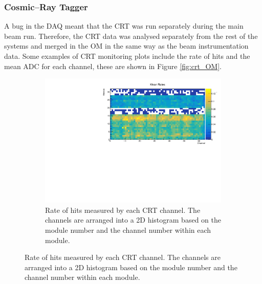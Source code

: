 \subsubsection*{Cosmic--Ray Tagger}
A bug in the DAQ meant that the CRT was run separately during the main beam 
run. Therefore, the CRT data was analysed separately from the rest of the 
\protodune{} systems and merged in the OM in the same way as the beam 
instrumentation data. Some examples of CRT monitoring plots include the rate 
of hits and the mean ADC for each channel, these are shown in Figure 
\ref{fig:crt_OM}.

\begin{figure}

	\centering

	\begin{subfigure}[b]{0.8\textwidth}
		\centering
		\vspace{3mm}
		\includegraphics[width=\textwidth]{figures/crt_rate_om.pdf}
		\caption {Rate of hits measured by each CRT channel. The channels are
		arranged into a 2D histogram based on the module number and the channel
		number within each module.}
		\label{fig:crt_rate_om}
	\end{subfigure}


\end{figure}
